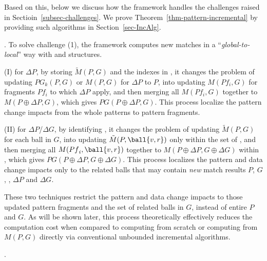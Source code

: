 Based on this, below we discuss how the framework handles the challenges raised in Sectioin~\ref{subsec-challenges}. We prove Theorem~\ref{thm-pattern-incremental} by providing such algorithms in Section~\ref{sec-IncAlg}.

. To solve challenge (1), the framework computes new matches in a ``{\em global-to-local}'' way with \fb and \ballfilter structures.

\sstab (I) for $\Delta P$, by storing $\tilde{M}(P,G)$ and the indexes in \fbmatstruct, it changes the problem of updating $PG_k(P,G)$ or $M(P,G)$ for $\Delta P$ to $P$, into updating $M({Pf}_i, G)$ for fragments ${Pf}_i$ to which $\Delta P$ apply, and then merging all $M({Pf}_i, G)$ together to $M(P\oplus \Delta P, G)$, which gives $PG(P\oplus \Delta P, G)$. This process localize the pattern change impacts from the whole patterns to pattern fragments.

\sstab (II) for $\Delta P$/$\Delta G$, by identifying \affballsx, it changes the problem of updating $\tilde{M}(P,G)$ for each ball in $G$, into updating $\tilde{M}(P, \ball{v,r})$ only within the set of \affballsx, and then merging all $M({Pf}_i, \ball{v,r})$ together to $M(P\oplus \Delta P, G\oplus \Delta G)$ within \affballsx, which gives $PG(P\oplus \Delta P,G\oplus \Delta G)$. This process localizes the pattern and data change impacts only to the related balls that may contain {\em new} match results \wrt $P$, $G$, \fbmatstruct, $\Delta P$ and $\Delta G$.

These two techniques restrict the pattern and data change impacts to those updated pattern fragments and the set of related balls in $G$, instead of entire $P$ and $G$. As will be shown later, this process theoretically effectively reduces the computation cost when compared to computing from scratch or computing from $M(P,G)$ directly via conventional unbounded incremental algorithms.


.

